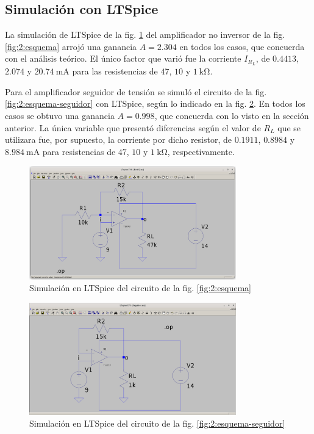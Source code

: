 \subsection{Simulación con LTSpice}

La simulación de LTSpice de la fig. \ref{fig:2:ltspice} del amplificador no
inversor de la fig. \ref{fig:2:esquema} arrojó una ganancia $A = 2.304$ en
todos los casos, que concuerda con el análisis teórico. El único factor que
varió fue la corriente $I_{R_L}$, de $0.4413$, $2.074$ y
$\SI{20.74}{\milli\ampere}$ para las resistencias de $47$, $10$ y 
$\SI{1}{\kilo\ohm}$.

Para el amplificador seguidor de tensión se simuló el circuito de la fig.
\ref{fig:2:esquema-seguidor} con LTSpice, según lo indicado en la fig.
\ref{fig:2:ltspice-seguidor}. En todos los casos se obtuvo una ganancia $A=0.998$, que
concuerda con lo visto en la sección anterior. La única variable que presentó
diferencias según el valor de $R_L$ que se utilizara fue, por supuesto, la 
corriente por dicho resistor, de $0.1911$, $0.8984$ y
$\SI{8.984}{\milli\ampere}$ para resistencias de $47$, $10$ y
$\SI{1}{\kilo\ohm}$, respectivamente.

\begin{figure}[H]
    \centering
    \includegraphics[width=0.8\textwidth]{img/2/ltspice.png}
    \caption{Simulación en LTSpice del circuito de la fig. \ref{fig:2:esquema}}
    \label{fig:2:ltspice}
\end{figure}

\begin{figure}[H]
    \centering
    \includegraphics[width=0.8\textwidth]{img/2/ltspice-seguidor.png}
    \caption{Simulación en LTSpice del circuito de la fig.
        \ref{fig:2:esquema-seguidor}}
    \label{fig:2:ltspice-seguidor}
\end{figure}

